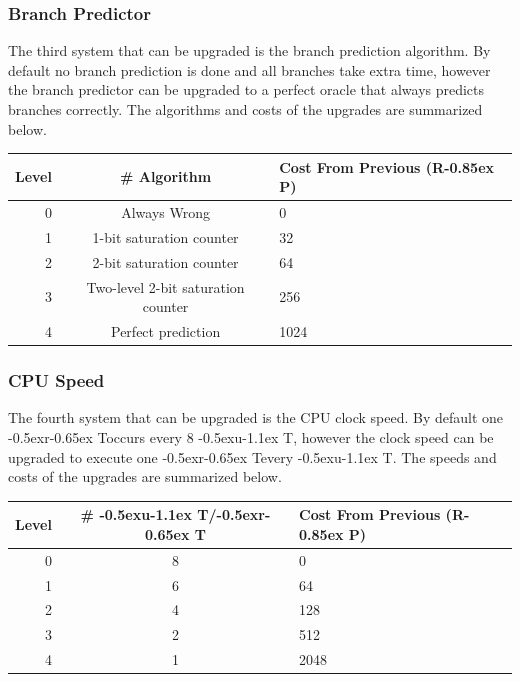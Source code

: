 \documentclass{article}
\newcommand{\UT}{\lower-0.5ex\hbox{u}\kern-1.1ex T}
\newcommand{\RT}{\lower-0.5ex\hbox{r}\kern-0.65ex T}
\newcommand{\RP}{R\kern-0.85ex P}
\begin{document}
\subsubsection{Branch Predictor}

The third system that can be upgraded is the branch prediction algorithm. By
default no branch prediction is done and all branches take extra time, however
the branch predictor can be upgraded to a perfect oracle that always predicts
branches correctly. The algorithms and costs of the upgrades are summarized
below.

\begin{minipage}{\textwidth}
\centering
\begin{tabular}{|r|c|l|}
    \hline Level & \# Algorithm & Cost From Previous (\RP) \\ \hline
    0 & Always Wrong & 0 \\ \hline
    1 & 1-bit saturation counter & 32 \\ \hline
    2 & 2-bit saturation counter & 64 \\ \hline
    3 & Two-level 2-bit saturation counter & 256 \\ \hline
    4 & Perfect prediction & 1024 \\ \hline
\end{tabular}
\end{minipage}

\subsubsection{CPU Speed}

The fourth system that can be upgraded is the CPU clock speed. By default one
\RT occurs every 8 \UT, however the clock speed can be upgraded to execute one
\RT every \UT. The speeds and costs of the upgrades are summarized below.

\begin{minipage}{\textwidth}
\centering
\begin{tabular}{|r|c|l|}
    \hline Level & \# \UT/\RT & Cost From Previous (\RP) \\ \hline
    0 & 8 & 0 \\ \hline
    1 & 6 & 64 \\ \hline
    2 & 4 & 128 \\ \hline
    3 & 2 & 512 \\ \hline
    4 & 1 & 2048 \\ \hline
\end{tabular}
\end{minipage}
\end{document}
